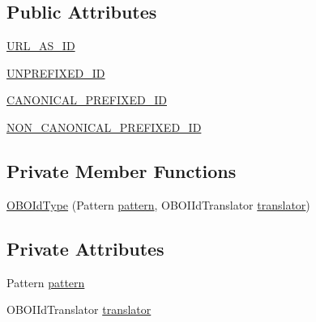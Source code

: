 \subsection*{Public Attributes}
\begin{DoxyCompactItemize}
\item 
\hyperlink{enumorg_1_1coode_1_1owlapi_1_1obo_1_1parser_1_1_o_b_o_id_type_aadc8930dd1024a4a5b90c1675bd93e47}{U\-R\-L\-\_\-\-A\-S\-\_\-\-I\-D}
\item 
\hyperlink{enumorg_1_1coode_1_1owlapi_1_1obo_1_1parser_1_1_o_b_o_id_type_aa706cd9c2210b7c5a3b5a8aa12f54c5f}{U\-N\-P\-R\-E\-F\-I\-X\-E\-D\-\_\-\-I\-D}
\item 
\hyperlink{enumorg_1_1coode_1_1owlapi_1_1obo_1_1parser_1_1_o_b_o_id_type_aa56819c29d7ba4b305d0677725b7ff8e}{C\-A\-N\-O\-N\-I\-C\-A\-L\-\_\-\-P\-R\-E\-F\-I\-X\-E\-D\-\_\-\-I\-D}
\item 
\hyperlink{enumorg_1_1coode_1_1owlapi_1_1obo_1_1parser_1_1_o_b_o_id_type_a5f0b56aac9ad13b720adf15dd688141c}{N\-O\-N\-\_\-\-C\-A\-N\-O\-N\-I\-C\-A\-L\-\_\-\-P\-R\-E\-F\-I\-X\-E\-D\-\_\-\-I\-D}
\end{DoxyCompactItemize}
\subsection*{Private Member Functions}
\begin{DoxyCompactItemize}
\item 
\hyperlink{enumorg_1_1coode_1_1owlapi_1_1obo_1_1parser_1_1_o_b_o_id_type_a495213facbda7ae85a00fcb39cd24111}{O\-B\-O\-Id\-Type} (Pattern \hyperlink{enumorg_1_1coode_1_1owlapi_1_1obo_1_1parser_1_1_o_b_o_id_type_a96e9f1065e295281966c2017f101cfef}{pattern}, O\-B\-O\-I\-Id\-Translator \hyperlink{enumorg_1_1coode_1_1owlapi_1_1obo_1_1parser_1_1_o_b_o_id_type_a8eb8b19ec179fb0a8a473c3db3b4b60e}{translator})
\end{DoxyCompactItemize}
\subsection*{Private Attributes}
\begin{DoxyCompactItemize}
\item 
Pattern \hyperlink{enumorg_1_1coode_1_1owlapi_1_1obo_1_1parser_1_1_o_b_o_id_type_a96e9f1065e295281966c2017f101cfef}{pattern}
\item 
O\-B\-O\-I\-Id\-Translator \hyperlink{enumorg_1_1coode_1_1owlapi_1_1obo_1_1parser_1_1_o_b_o_id_type_a8eb8b19ec179fb0a8a473c3db3b4b60e}{translator}
\end{DoxyCompactItemize}


